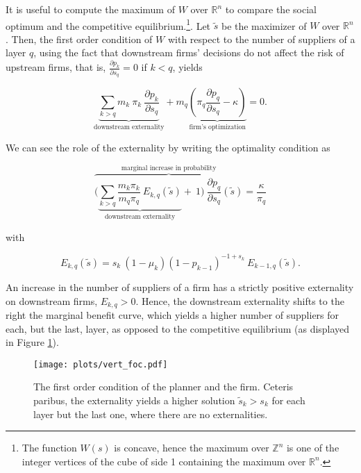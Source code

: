 \documentclass[american, abstract=on]{scrartcl}
\renewcommand{\Re}{\mathbb{R}}
\begin{document}
It is useful to compute the maximum of $W$ over $\Re^n$ to compare the social optimum and the competitive equilibrium.\footnote{The function $W(s)$ is concave, hence the maximum over $\mathbb{Z}^n$ is one of the integer vertices of the cube of side 1 containing the maximum over $\Re^n$.}. Let $\tilde{s}$ be the maximizer of $W$ over $\Re^n$. Then, the first order condition of $W$ with respect to the number of suppliers of a layer $q$, using the fact that downstream firms' decisions do not affect the risk of upstream firms, that is, $\frac{\partial p_k}{\partial s_q} = 0$ if $k < q$, yields

\begin{equation}
  \underbrace{\sum_{k > q} m_k \ \pi_k \ \frac{\partial p_k}{\partial s_q}}_{\text{downstream externality}} + m_q  \underbrace{\left( \pi_q \frac{\partial p_q}{\partial s_q} - \kappa\right)}_{\text{firm's optimization}} = 0.
\end{equation}

We can see the role of the externality by writing the optimality condition as 

\begin{equation} \label{eq:distortion}
  \overbrace{\Bigg(\underbrace{\sum_{k > q} \frac{m_k\pi_k}{m_q\pi_q} \ E_{k, q}(\tilde{s})}_{\text{downstream externality}} + \ 1 \Bigg)\ \frac{\partial p_q}{\partial s_q}(\tilde{s})}^{\text{marginal increase in probability}} = \frac{\kappa}{\pi_q}
\end{equation}

with

\begin{equation}
  E_{k, q}(\tilde{s}) = s_k \ (1 - \mu_k) (1 - p_{k-1})^{-1 + s_k}\ E_{k - 1, q}(\tilde{s}).
\end{equation}

An increase in the number of suppliers of a firm has a strictly positive externality on downstream firms, $E_{k, q} > 0$. Hence, the downstream externality shifts to the right the marginal benefit curve, which yields a higher number of suppliers for each, but the last, layer, as opposed to the competitive equilibrium (as displayed in Figure \ref{fig:vert_foc}).


\begin{figure}[H]
  \centering
  \texttt{[image: plots/vert\_foc.pdf]} 
  \caption{The first order condition of the planner and the firm. Ceteris paribus, the externality yields a higher solution $\tilde{s}_k > s_k$ for each layer but the last one, where there are no externalities.}
  \label{fig:vert_foc}
\end{figure}
\end{document}
